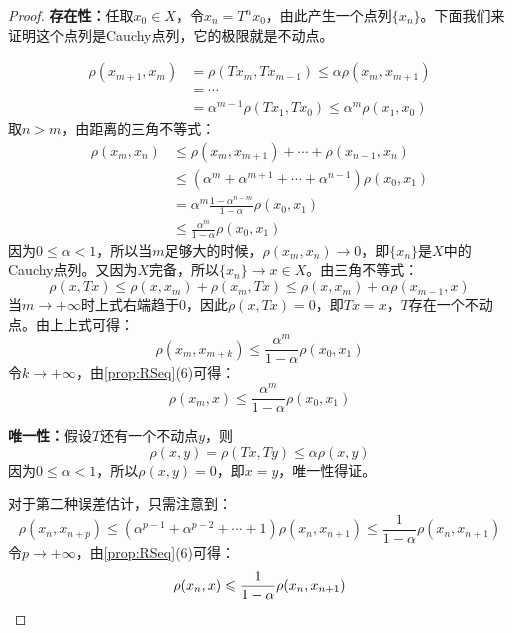 \begin{proof}
	\textbf{存在性：}任取$x_0\in X$，令$x_n=T^nx_0$，由此产生一个点列$\{x_n\}$。下面我们来证明这个点列是Cauchy点列，它的极限就是不动点。\par
	\begin{align*}
		\rho(x_{m+1},x_m)&=\rho(Tx_m,Tx_{m-1})\leqslant\alpha\rho(x_m,x_{m+1}) \\
		&=\cdots \\
		&=\alpha^{m-1}\rho(Tx_1,Tx_0)\leqslant\alpha^m\rho(x_1,x_0)
	\end{align*}
	取$n>m$，由距离的三角不等式：
	\begin{align*}
		\rho(x_m,x_n)
		&\leqslant\rho(x_m,x_{m+1})+\cdots+\rho(x_{n-1},x_n) \\
		&\leqslant(\alpha^m+\alpha^{m+1}+\cdots+\alpha^{n-1})\rho(x_0,x_1) \\
		&=\alpha^m\frac{1-\alpha^{n-m}}{1-\alpha}\rho(x_0,x_1) \\
		&\leqslant\frac{\alpha^m}{1-\alpha}\rho(x_0,x_1)
	\end{align*}
	因为$0\leqslant\alpha<1$，所以当$m$足够大的时候，$\rho(x_m,x_n)\rightarrow 0$，即$\{x_n\}$是$X$中的Cauchy点列。又因为$X$完备，所以$\{x_n\}\rightarrow x\in X$。由三角不等式：
	\begin{equation*}
		\rho(x,Tx)\leqslant\rho(x,x_m)+\rho(x_m,Tx)\leqslant\rho(x,x_m)+\alpha\rho(x_{m-1},x)
	\end{equation*}
	当$m\to+\infty$时上式右端趋于0，因此$\rho(x,Tx)=0$，即$Tx=x$，$T$存在一个不动点。由上上式可得：
	\begin{equation*}
		\rho(x_m,x_{m+k})\leqslant\frac{\alpha^m}{1-\alpha}\rho(x_0,x_1)
	\end{equation*}
	令$k\to+\infty$，由\cref{prop:RSeq}(6)可得：
	\begin{equation*}
		\rho(x_m,x)\leqslant\frac{\alpha^m}{1-\alpha}\rho(x_0,x_1)
	\end{equation*}\par
	\textbf{唯一性：}假设$T$还有一个不动点$y$，则
	\begin{equation*}
		\rho(x,y)=\rho(Tx,Ty)\leqslant\alpha\rho(x,y)
	\end{equation*}
	因为$0\leqslant\alpha<1$，所以$\rho(x,y)=0$，即$x=y$，唯一性得证。\par
	对于第二种误差估计，只需注意到：
	\begin{equation*}
		\rho(x_n,x_{n+p})\leqslant(\alpha^{p-1}+\alpha^{p-2}+\cdots+1)\rho(x_n,x_{n+1})\leqslant\frac{1}{1-\alpha}\rho(x_n,x_{n+1})
	\end{equation*}
	令$p\to+\infty$，由\cref{prop:RSeq}(6)可得：
	\begin{equation*}
		\rho(x_n,x)\leqslant\frac{1}{1-\alpha}\rho(x_n,x_{n+1})\qedhere
	\end{equation*}
\end{proof}
